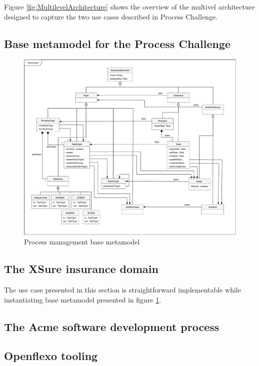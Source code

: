 
Figure \ref{fig:MultilevelArchitecture} shows the overview of the multivel architecture designed to capture the two use cases described in Process Challenge.


\subsection{Base metamodel for the Process Challenge}

\begin{figure}
 \centering
    \includegraphics[width=1.0 \textwidth]{Figures/Metamodel.pdf}
    \caption{Process management base metamodel}
    \label{fig:BaseMetamodel}
\end{figure}

\subsection{The XSure insurance domain}

The use case presented in this section is straightforward implementable while instantiating base metamodel presented in figure \ref{fig:BaseMetamodel}.



\subsection{The Acme software development process}

\subsection{Openflexo tooling}



